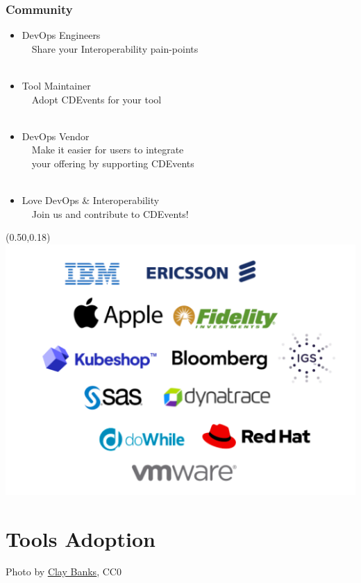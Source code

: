 \documentclass[aspectratio=169,11pt,hyperref={colorlinks=true}]{beamer}
\begin{document}
\begin{blackframe}
  \frametitle{Community}
  \begin{itemize}
    \item DevOps Engineers\\
            ~~Share your Interoperability pain-points\\~
    \item Tool Maintainer\\
            ~~Adopt CDEvents for your tool\\~
    \item DevOps Vendor\\
            ~~Make it easier for users to integrate\\
            ~~your offering by supporting CDEvents\\~
    \item Love DevOps \& Interoperability\\
            ~~Join us and contribute to CDEvents!
  \end{itemize}
  \begin{textblock*}{0.45\paperwidth}(0.50\paperwidth,0.18\paperheight)
    \includegraphics[width=0.45\paperwidth]{img/cdevents-community.png}
  \end{textblock*}
\end{blackframe}

\section{Tools Adoption}
\begin{sectionwithpiclargecentral}{Photo by \href{https://unsplash.com/@claybanks}{\underline{Clay Banks}}, CC0}
\end{sectionwithpiclargecentral}
\end{document}
